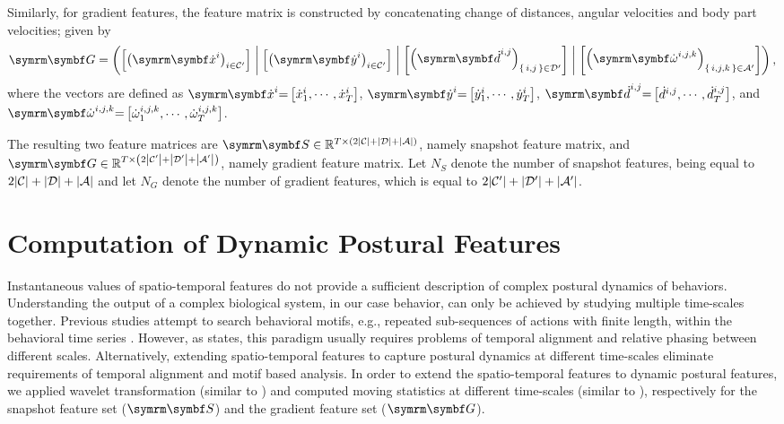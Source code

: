 Similarly, for gradient features, the feature matrix is constructed by concatenating change of distances, angular velocities and body part velocities; given by
\begin{equation}
	\V{G} = \rbr{\qmatrix{\rbr{\V{\dot{x}}^i}_{i \in \mathcal{C}^{\prime}}} \concat \qmatrix{\rbr{\V{\dot{y}}^i}_{i \in \mathcal{C}^{\prime}}} \concat \qmatrix{\rbr{\V{\dot{d}}^{i,j}}_{\set{i,j} \in \mathcal{D}^{\prime}}} \concat \qmatrix{\rbr{\V{\dot{\omega}}^{i,j,k}}_{\set{i,j,k} \in \mathcal{A}^{\prime}}}},
\end{equation}
where the vectors are defined as $\V{\dot{x}}^{i}{=}\qmatrix{\dot{x}^{i}_1, \cdots, \dot{x}^{i}_T}$, $\V{\dot{y}}^{i}{=}\qmatrix{\dot{y}^{i}_1, \cdots, \dot{y}^{i}_T}$,   $\V{\dot{d}}^{i,j}{=}\qmatrix{\dot{d}^{i,j}, \cdots, \dot{d}^{i,j}_T}$, and $\V{\dot{\omega}}^{i,j,k}{=}\qmatrix{\dot{\omega}_1^{i,j,k}, \cdots, \dot{\omega}^{i,j,k}_T}$.

The resulting two feature matrices are $\V{S} \in \mathbb{R}^{T \times \rbr{2\card*{\mathcal{C}}+\card*{\mathcal{D}}+\card*{\mathcal{A}}}}$, namely snapshot feature matrix, and $\V{G} \in \mathbb{R}^{T \times \rbr{2\card*{\mathcal{C}^{\prime}}+\card*{\mathcal{D}^{\prime}}+\card*{\mathcal{A}^{\prime}}}}$, namely gradient feature matrix.
Let $N_S$ denote the number of snapshot features, being equal to $2\card*{\mathcal{C}}+\card*{\mathcal{D}}+\card*{\mathcal{A}}$ and let $N_G$ denote the number of gradient features, which is equal to $2\card*{\mathcal{C}^{\prime}}+\card*{\mathcal{D}^{\prime}}+\card*{\mathcal{A}^{\prime}}$.

\section{Computation of Dynamic Postural Features}\label{section:dynamic-postural-features}
Instantaneous values of spatio-temporal features do not provide a sufficient description of complex postural dynamics of behaviors.
Understanding the output of a complex biological system, in our case behavior, can only be achieved by studying multiple time-scales together.
Previous studies attempt to search behavioral motifs, e.g., repeated sub-sequences of actions with finite length, within the behavioral time series \citep{ye_time_2011, brown_dictionary_2013}.
However, as \citet{berman_mapping_2014} states, this paradigm usually requires problems of temporal alignment and relative phasing between different scales.
Alternatively, extending spatio-temporal features to capture postural dynamics at different time-scales eliminate requirements of temporal alignment and motif based analysis.
In order to extend the spatio-temporal features to dynamic postural features, we applied wavelet transformation (similar to \citet{berman_mapping_2014}) and computed moving statistics at different time-scales (similar to \citet{kabra_jaaba_2013}), respectively for the snapshot feature set ($\V{S}$) and the gradient feature set ($\V{G}$).

